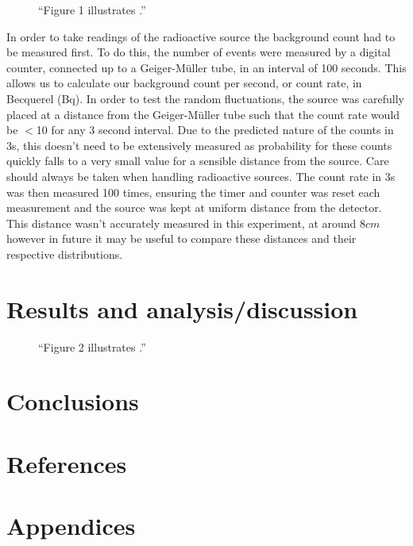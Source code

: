 \documentclass[11pt]{article}
\begin{document}
    \begin{figure}[ht]
        \begin{center}
            \def\svgwidth{\columnwidth}
            
             \caption{“Figure 1 illustrates .”}
             \label{fig:experimental setup}
        \end{center}
    \end{figure}

    In order to take readings of the radioactive source the background count had to be measured first. To do this, the number of events were measured by a digital counter, connected  up to a Geiger-Müller tube, in an interval of 100 seconds. This allows us to calculate our background count per second, or count rate, in Becquerel (Bq). 
    \newline
    In order to test the random fluctuations, the  source was carefully placed at a distance from the Geiger-Müller tube such that the count rate would be $<$10 for any 3 second interval. Due to the predicted nature of the counts in 3s, this doesn't need to be extensively measured as probability for these counts quickly falls to a very small value for a sensible distance from the source. Care should always be taken when handling radioactive sources. 
    \newline
    The count rate in 3s was then measured 100 times, ensuring the timer and counter was reset each measurement and the source was kept at uniform distance from the detector. This distance wasn't accurately measured in this experiment, at around $8 cm$ however in future it may be useful to compare these distances and their respective distributions. 
    \newline 
    
    \section{Results and analysis/discussion}
       \begin{figure}[ht]
        \begin{center}
            \def\svgwidth{\columnwidth}
            
             \caption{“Figure 2 illustrates .”}
             \label{fig:experimental results 1}
        \end{center}
    \end{figure}
    \section{Conclusions}
    \section{References}
    \section{Appendices}
    
     
\end{document}

